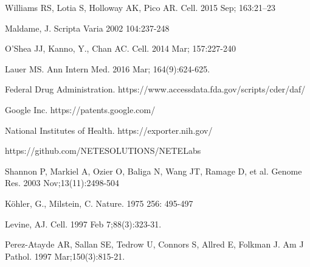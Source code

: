 \documentclass[10pt,letterpaper]{article}
\begin{document}
\nolinenumbers
 
\begin{thebibliography}{10}

Williams RS, Lotia S, Holloway AK, Pico AR.
\newblock Cell. 2015 Sep; 163:21--23

Maldame, J.
\newblock Scripta Varia 2002 104:237-248

O'Shea JJ, Kanno, Y., Chan AC.
\newblock Cell. 2014 Mar; 157:227-240

Lauer MS.
\newblock Ann Intern Med. 2016 Mar; 164(9):624-625.

Federal Drug Administration.
\newblock https://www.accessdata.fda.gov/scripts/cder/daf/

Google Inc.
\newblock https://patents.google.com/

National Institutes of Health.
\newblock https://exporter.nih.gov/

\newblock https://github.com/NETESOLUTIONS/NETELabs

Shannon P, Markiel A, Ozier O, Baliga N, Wang JT, Ramage D, et al.
\newblock Genome Res. 2003 Nov;13(11):2498-504

K\"ohler, G., Milstein, C.
\newblock Nature. 1975 256: 495-497

Levine, AJ.
\newblock Cell. 1997 Feb 7;88(3):323-31.

Perez-Atayde AR, Sallan SE, Tedrow U, Connors S, Allred E, Folkman J.
\newblock Am J Pathol. 1997 Mar;150(3):815-21.


\end{thebibliography}
\end{document}
